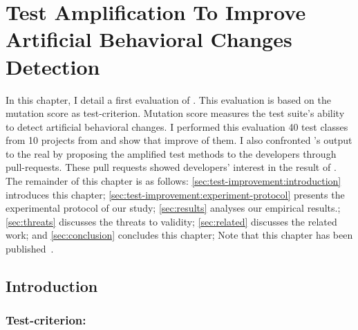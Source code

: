\chapter{Test Amplification To Improve Artificial Behavioral Changes Detection}

\begin{chaptersummary}
	In this chapter, I detail a first evaluation of \dspot. 
	This evaluation is based on the mutation score as test-criterion.
	Mutation score measures the test suite's ability to detect artificial behavioral changes.
	I performed this evaluation 40 test classes from 10 projects from \gh and show that \dspot improve  of them.
	I also confronted \dspot's output to the real by proposing the amplified test methods to the developers through pull-requests.
	These pull requests showed developers' interest in the result of \dspot.
	The remainder of this chapter is as follows:
	\autoref{sec:test-improvement:introduction} introduces this chapter;
	\autoref{sec:test-improvement:experiment-protocol} presents the experimental protocol of our study;
	\autoref{sec:results} analyses our empirical results.;
	\autoref{sec:threats} discusses the threats to validity;
	\autoref{sec:related} discusses the related work;
	and \autoref{sec:conclusion} concludes this chapter;
	Note that this chapter has been published~\cite{Danglot2019}.
\end{chaptersummary}

\minitoc

\graphicspath{{.}{chapitres/test-improvement/}}

\section{Introduction}
\label{sec:test-improvement:introduction}

\subsection{Test-criterion: \ms}
\label{subsec:test-improvement:introduction:test-criterion}

